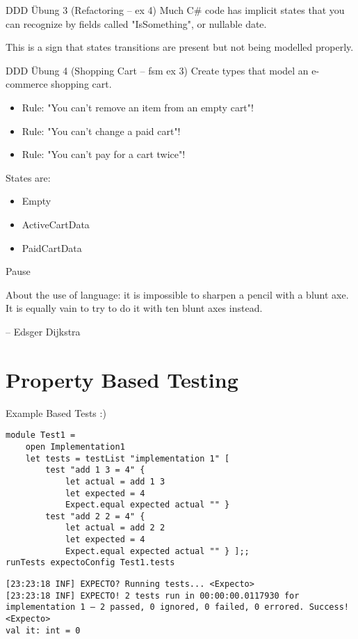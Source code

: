 \documentclass[t]{beamer}
\begin{document}
\begin{frame}[label={sec:org550de0a}]{DDD Übung 3 (Refactoring -- ex 4)}
Much C\# code has implicit states that you can recognize by fields called "IsSomething", or nullable date.

This is a sign that states transitions are present but not being modelled properly.
\end{frame}

\begin{frame}[label={sec:org1ffe9b5}]{DDD Übung 4 (Shopping Cart -- fsm ex 3)}
Create types that model an e-commerce shopping cart.

\begin{itemize}
\item Rule: "You can't remove an item from an empty cart"!
\item Rule: "You can't change a paid cart"!
\item Rule: "You can't pay for a cart twice"!
\end{itemize}

States are:
\begin{itemize}
\item Empty
\item ActiveCartData
\item PaidCartData
\end{itemize}
\end{frame}

\begin{frame}[label={sec:org02565e6}]{Pause}
\begin{block}{}
About the use of language: it is impossible to sharpen a pencil with a blunt axe. 
It is equally vain to try to do it with ten blunt axes instead.

\null\hfill -- Edsger Dijkstra
\end{block}
\end{frame}

\section{Property Based Testing }
\label{sec:orgdc574d9}
\begin{frame}[label={sec:orgfb7c4a2},fragile]{Example Based Tests :)}
 \begin{verbatim}
module Test1 =
    open Implementation1
    let tests = testList "implementation 1" [
        test "add 1 3 = 4" {
            let actual = add 1 3
            let expected = 4
            Expect.equal expected actual "" }
        test "add 2 2 = 4" {
            let actual = add 2 2
            let expected = 4
            Expect.equal expected actual "" } ];;
runTests expectoConfig Test1.tests
\end{verbatim}

\begin{verbatim}
[23:23:18 INF] EXPECTO? Running tests... <Expecto>
[23:23:18 INF] EXPECTO! 2 tests run in 00:00:00.0117930 for implementation 1 – 2 passed, 0 ignored, 0 failed, 0 errored. Success! <Expecto>
val it: int = 0
\end{verbatim}
\end{frame}
\end{document}
